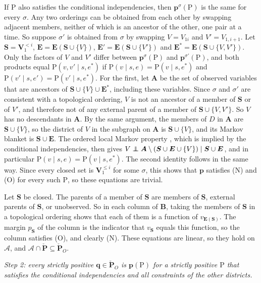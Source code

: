 \documentclass[12pt]{article}
\newcommand\indep{\protect\mathpalette{\protect\independenT}{\perp}}
\def\independenT#1#2{\mathrel{\rlap{$#1#2$}\mkern2mu{#1#2}}}
\def\Pr{{\mathrm{P}}}
\newcommand{\bV}{\boldsymbol{V}}
\newcommand{\bS}{\boldsymbol{S}}
\begin{document}
If $\Pr$ also satisfies the conditional independencies, then $\boldsymbol{p}^\sigma(\Pr)$ is the same for every $\sigma$. Any two orderings can be obtained from each other by swapping adjacent members, neither of which is an ancestor of the other, one pair at a time. So suppose $\sigma'$ is obtained from $\sigma$ by swapping $V = V_{1i}$ and $V' = V_{1,i+1}$. Let $\bS = \bV_1^{<i}$, $\boldsymbol{E} = \boldsymbol{E}(\bS \cup \{V\})$, $\boldsymbol{E}' = \boldsymbol{E}(\bS \cup \{V'\})$ and $\boldsymbol{E}^* = \boldsymbol{E}(\bS \cup \{V, V'\})$. Only the factors of $V$ and $V'$ differ between $\boldsymbol{p}^\sigma(\Pr)$ and $\boldsymbol{p}^{\sigma'}(\Pr)$, and both products equal $\Pr(v, v' \mid s, e^*)$ if $\Pr(v \mid s, e) = \Pr(v \mid s, e^*)$ and $\Pr(v' \mid s, e') = \Pr(v' \mid s, e^*)$. For the first, let $\boldsymbol{A}$ be the set of observed variables that are ancestors of $\bS \cup \{V\} \cup \boldsymbol{E}^*$, including these variables. Since $\sigma$ and $\sigma'$ are consistent with a topological ordering, $V$ is not an ancestor of a member of $\bS$ or of $V'$, and therefore not of any external parent of a member of $\bS \cup \{V, V'\}$. So $V$ has no descendants in $\boldsymbol{A}$. By the same argument, the members of $D$ in $\boldsymbol{A}$ are $\bS \cup \{V\}$, so the district of $V$ in the subgraph on $\boldsymbol{A}$ is $\bS \cup \{V\}$, and its Markov blanket is $\bS \cup \boldsymbol{E}$. The ordered local Markov property \citep{richardson2003admgs}, which is implied by the conditional independencies, then gives $V \indep \boldsymbol{A} \setminus (\bS \cup \boldsymbol{E} \cup \{V\}) \mid \bS \cup \boldsymbol{E}$, and in particular $\Pr(v \mid s, e) = \Pr(v \mid s, e^*)$. The second identity follows in the same way. Since every closed set is $\bV_1^{\leq i}$ for some $\sigma$, this shows that $\boldsymbol{p}$ satisfies (N) and (O) for every such $\Pr$, so these equations are trivial.

Let $\bS$ be closed. The parents of a member of $\bS$ are members of $\bS$, external parents of $\bS$, or unobserved. So in each column of $\boldsymbol{B}$, taking the members of $\bS$ in a topological ordering shows that each of them is a function of $v_{\boldsymbol{E}(\bS)}$. The margin $p_{\bS}$ of the column is the indicator that $v_{\bS}$ equals this function, so the column satisfies (O), and clearly (N). These equations are linear, so they hold on $\mathcal{A}$, and $\mathcal{A} \cap \boldsymbol{\check{P}} \subseteq \boldsymbol{\check{P}}_O$.

\emph{Step 2: every strictly positive $\boldsymbol{q} \in \boldsymbol{\check{P}}_O$ is $\boldsymbol{p}(\Pr)$ for a strictly positive $\Pr$ that satisfies the conditional independencies and all constraints of the other districts.} 
\end{document}
